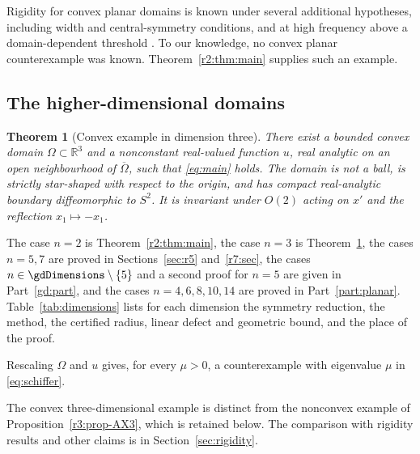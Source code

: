 \documentclass[11pt]{amsart}
\newtheorem{theorem}{Theorem}[section]
\theoremstyle{definition}
\theoremstyle{remark}
\numberwithin{equation}{section}
\newcommand{\R}{\mathbb{R}}
\begin{document}
Rigidity for convex planar domains is known under several additional hypotheses, including width and central-symmetry conditions, and at high frequency above a domain-dependent threshold \cite{BK82,Mon26,Dal00,DSWZ25}. To our knowledge, no convex planar counterexample was known. Theorem~\ref{r2:thm:main} supplies such an example.

\subsection{The higher-dimensional domains}



\begin{theorem}[Convex example in dimension three]\label{thm:r3}
There exist a bounded convex domain $\Omega\subset\R^3$ and a nonconstant real-valued function $u$, real analytic on an open neighbourhood of $\overline\Omega$, such that
\eqref{eq:main} holds.
The domain is not a ball, is strictly star-shaped with respect to the origin, and has compact real-analytic boundary diffeomorphic to $S^2$. It is invariant under $O(2)$ acting on $x'$ and the reflection $x_1\mapsto-x_1$.
\end{theorem}





The case $n=2$ is Theorem~\ref{r2:thm:main}, the case $n=3$ is Theorem~\ref{thm:r3}, the cases $n=5,7$ are proved in Sections~\ref{sec:r5} and~\ref{r7:sec}, the cases $n\in\gdDimensions\setminus\{5\}$ and a second proof for $n=5$ are given in Part~\ref{gd:part}, and the cases $n=4,6,8,10,14$ are proved in Part~\ref{part:planar}. Table~\ref{tab:dimensions} lists for each dimension the symmetry reduction, the method, the certified radius, linear defect and geometric bound, and the place of the proof.

Rescaling $\Omega$ and $u$ gives, for every $\mu>0$, a counterexample with eigenvalue $\mu$ in \eqref{eq:schiffer}.



The convex three-dimensional example is distinct from the nonconvex example of Proposition~\ref{r3:prop-AX3}, which is retained below. The comparison with rigidity results and other claims is in Section~\ref{sec:rigidity}.
\end{document}

